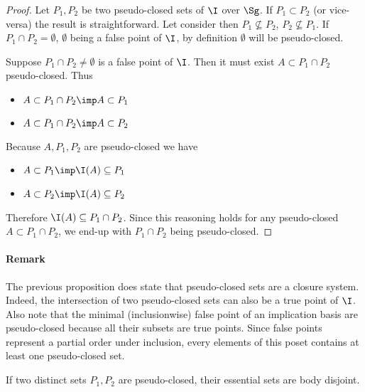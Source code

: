 \begin{proof} Let $P_1, P_2$ be two pseudo-closed sets of $\I$ over $\Sg$. If
$P_1 \subset P_2$ (or vice-versa) the result is straightforward. Let consider
then $P_1 \nsubseteq P_2$, $P_2 \nsubseteq P_1$. If $P_1 \cap P_2 = \emptyset$, 
$\emptyset$ being a false point of $\I$, by  definition $\emptyset$ will be 
pseudo-closed.

Suppose $P_1 \cap P_2 \neq \emptyset$ is a false point of $\I$. Then it must 
exist $A \subset P_1 \cap P_2$ pseudo-closed. Thus
\begin{itemize}
	\item $A \subset P_1 \cap P_2 \imp A \subset P_1$ 
	\item $A \subset P_1 \cap P_2 \imp A \subset P_2$
\end{itemize}
\noindent Because $A, P_1, P_2$ are pseudo-closed we have
\begin{itemize}
	\item $A \subset P_1 \imp \I(A) \subseteq P_1$
	\item $A \subset P_2 \imp \I(A) \subseteq P_2$
\end{itemize}
\noindent Therefore $\I(A) \subseteq P_1 \cap P_2$. Since this reasoning holds 
for any pseudo-closed $A \subset P_1 \cap P_2$, we end-up with $P_1 \cap P_2$ 
being pseudo-closed.


	
\end{proof}

\paragraph{Remark} The previous proposition does  state that
pseudo-closed sets are a closure system. Indeed, the intersection of two 
pseudo-closed sets can also be a true point of $\I$. Also note that the minimal
(inclusionwise) false point of an implication basis are pseudo-closed because
all their subsets are true points. Since false points represent a partial order
under inclusion, every elements of this poset contains at least one 
pseudo-closed set.

\begin{proposition} If two distinct sets $P_1, P_2$ are pseudo-closed, their 
essential 
sets are body disjoint. 
	
\end{proposition}

